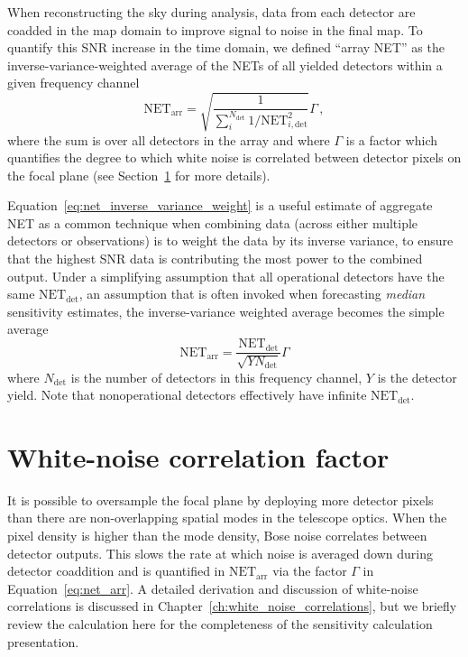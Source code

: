 When reconstructing the sky during analysis, data from each detector are coadded in the map domain to improve signal to noise in the final map. To quantify this SNR increase in the time domain, we defined ``array NET'' as the inverse-variance-weighted average of the NETs of all yielded detectors within a given frequency channel
\begin{equation}
    \mathrm{NET}_{\mathrm{arr}} = \sqrt{\frac{1}{ \sum_{i}^{N_{\mathrm{det}}} 1 /  \mathrm{NET}_{i, \mathrm{det}}^{2}}} \Gamma \, ,
    \label{eq:net_inverse_variance_weight}
\end{equation}
where the sum is over all detectors in the array and where $\Gamma$ is a factor which quantifies the degree to which white noise is correlated between detector pixels on the focal plane (see Section~\ref{sec:sensitivity_calculation_correlation_factor} for more details). 

Equation~\ref{eq:net_inverse_variance_weight} is a useful estimate of aggregate NET as a common technique when combining data (across either multiple detectors or observations) is to weight the data by its inverse variance, to ensure that the highest SNR data is contributing the most power to the combined output. Under a simplifying assumption that all operational detectors have the same $\mathrm{NET_{det}}$, an assumption that is often invoked when forecasting \textit{median} sensitivity estimates, the inverse-variance weighted average becomes the simple average
\begin{equation}
    \mathrm{NET}_{\mathrm{arr}} = \frac{\mathrm{NET}_{\mathrm{det}}}{\sqrt{Y N_{\mathrm{det}}}} \Gamma
    \label{eq:net_arr}
\end{equation}
where $N_{\mathrm{det}}$ is the number of detectors in this frequency channel, $Y$ is the detector yield. Note that nonoperational detectors effectively have infinite $\mathrm{NET_{det}}$.


\section{White-noise correlation factor}
\label{sec:sensitivity_calculation_correlation_factor}

It is possible to oversample the focal plane by deploying more detector pixels than there are non-overlapping spatial modes in the telescope optics. When the pixel density is higher than the mode density, Bose noise correlates between detector outputs. This slows the rate at which noise is averaged down during detector coaddition and is quantified in $\mathrm{NET_{arr}}$ via the factor $\Gamma$ in Equation~\ref{eq:net_arr}. A detailed derivation and discussion of white-noise correlations is discussed in Chapter~\ref{ch:white_noise_correlations}, but we briefly review the calculation here for the completeness of the sensitivity calculation presentation.

